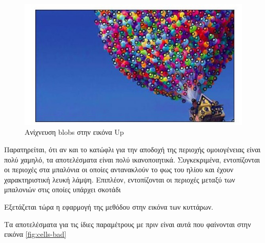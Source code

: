 \documentclass{article}
\newcommand{\eng}[1]{\foreignlanguage{english}{#1}}
\begin{document}
\begin{figure}[h]
    \centering
    \includegraphics[width=\textwidth]{../image-plots/images-scaled/blob-detection-up-scaled.jpg}
    \caption{Aνίχνευση \eng{blobs} στην εικόνα \eng{Up}}
    \label{fig:up-blobs}
\end{figure}
\FloatBarrier

Παρατηρείται, ότι αν και το κατώφλι για την αποδοχή της περιοχής ομοιογένειας είναι πολύ χαμηλό, τα αποτελέσματα είναι πολύ ικανοποιητικά. Συγκεκριμένα, εντοπίζονται οι περιοχές στα μπαλόνια οι οποίες αντανακλούν το φως του ηλίου και έχουν χαρακτηριστική λευκή λάμψη. Επιπλέον, εντοπίζονται οι περιοχές μεταξύ των μπαλονιών στις οποίες υπάρχει σκοτάδι

Εξετάζεται τώρα η εφαρμογή της μεθόδου στην εικόνα των κυττάρων.

Τα αποτελέσματα για τις ίδιες παραμέτρους με πριν είναι αυτά που φαίνονται στην εικόνα \ref{fig:cells-bad}
\end{document}
